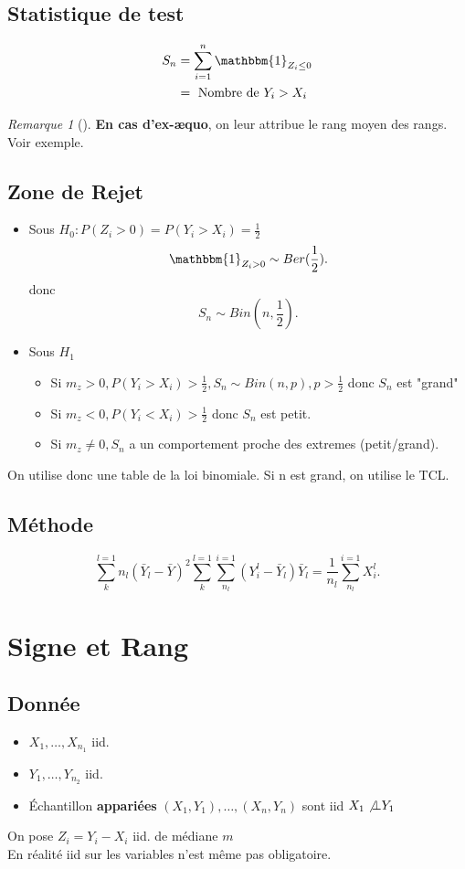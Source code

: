 \documentclass{article}
\theoremstyle{plain}%
\theoremstyle{definition}
\theoremstyle{remark}
\newtheorem*{rem}{Remarque}
\begin{document}
\subsection*{Statistique de test}
\begin{align*}
    S_n &= \sum_{i=1}^{n}\mathbbm{1}_{Z_i \leq 0} \\
    &= \text{ Nombre de } Y_i > X_i
\end{align*}
\begin{rem}[]
    \textbf{En cas d'ex-æquo}, on leur attribue le rang moyen des rangs. Voir exemple.
\end{rem}

\subsection*{Zone de Rejet}
\begin{itemize}
    \item Sous $ H_0 : P(Z_i > 0) = P(Y_i > X_i) = \frac{1}{2} $ 
    \[
        \mathbbm{1}_{Z_i > 0} \sim Ber(\frac{1}{2})
    .\]
    donc 
    \[
        S_n \sim Bin(n,\frac{1}{2})
    .\]

    \item Sous $ H_1 $ \begin{itemize}
        \item Si $ m_z > 0, P(Y_i > X_i) > \frac{1}{2}, S_n \sim Bin(n,p), p> \frac{1}{2} $ donc $ S_n $ est "grand"
        \item Si $ m_z < 0, P(Y_i < X_i) > \frac{1}{2} $ donc $ S_n $ est petit.
        \item Si $ m_z \neq  0, S_n $ a un comportement proche des extremes (petit/grand).
    \end{itemize}
\end{itemize}

On utilise donc une table de la loi binomiale. Si n est grand, on utilise le TCL.

\subsection*{Méthode}
\[
    \sum_{k}^{l=1}n_l(\bar{Y}_l - \bar{Y})^2
    \sum_{k}^{l=1}\sum_{n_l}^{i=1}(Y_i^l - \bar{Y}_l)
    \bar{Y}_l = \frac{1}{n_l}\sum_{n_l}^{i=1}X_i^l
.\]

\section{Signe et Rang}
\subsection*{Donnée}
\begin{itemize}
    \item $ X_1, \dots, X_{n_1}  $ iid. 
    \item $ Y_1, \dots, Y_{n_2}  $ iid. 
    \item Échantillon \textbf{appariées} $ (X_1, Y_1), \dots, (X_n, Y_n) $ sont iid $ X_1 \not \bot Y_1 $ 
\end{itemize}
On pose $ Z_i = Y_i - X_i $ iid. de médiane $ m $  \\ 
En réalité iid sur les variables n'est même pas obligatoire.
\end{document}
